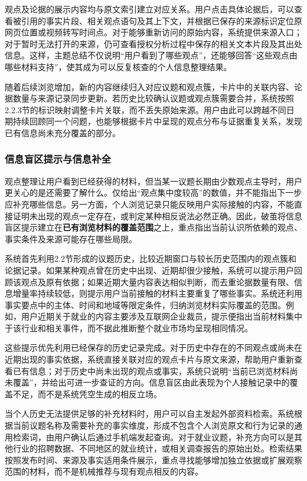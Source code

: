 观点及论据的展示内容均与原文索引建立对应关系。用户点击具体论据后，可以查看被引用的事实片段、相关观点语句及其上下文，并根据已保存的来源标识定位原网页位置或视频转写时间点。对于能够重新访问的原始内容，系统提供来源入口；对于暂时无法打开的来源，仍可查看授权分析过程中保存的相关文本片段及其出处信息。这样，主题总结不仅说明``用户看到了哪些观点''，还能够回答``这些观点由哪些材料支持''，使其成为可以反复核查的个人信息整理结果。

随着后续浏览增加，新的内容继续归入对应议题和观点簇，卡片中的关联内容、论据数量与来源记录同步更新。若历史比较确认议题或观点簇需要合并，系统按照2.2.3节的标识映射调整卡片关联，而不丢失原始来源。用户由此可以跨越不同日期持续回顾同一个问题，也能够根据卡片中呈现的观点分布与证据重复关系，发现已有信息尚未充分覆盖的部分。

\subsubsection{信息盲区提示与信息补全}\label{section:2.5.3}

观点整理让用户看到已经获得的材料，但当某一议题长期由少数观点主导时，用户更关心的是还需要了解什么。仅给出``观点集中度较高''的数值，并不能指出下一步应补充哪些信息。另一方面，个人浏览记录只能反映用户实际接触的内容，不能直接证明未出现的观点一定存在，或判定某种相反说法必然正确。因此，破茧将信息盲区提示建立在\textbf{已有浏览材料的覆盖范围}之上，重点指出当前认识所依赖的观点、事实条件及来源可能存在哪些局限。

系统首先利用2.2节形成的议题历史，比较近期窗口与较长历史范围内的观点簇和论据记录。如果某种观点曾在历史中出现、近期却很少接触，系统可以提示用户回顾该观点及原有依据；如果近期大量内容表达相似判断，而去重论据数量有限、信息增量率持续较低，则提示用户当前接触的材料主要重复了哪些事实。系统还利用事实要点中的主体、时间和地域等限定条件，归纳浏览材料实际覆盖的范围。例如，用户近期关于就业的内容主要涉及互联网企业裁员，提示便指出当前材料集中于该行业和相关事件，而不据此推断整个就业市场均呈现相同情况。

这些提示优先利用已经保存的历史记录完成。对于历史中存在的不同观点或尚未在近期出现的事实依据，系统直接关联对应的观点卡片与原文来源，帮助用户重新查看已有信息；对于历史中尚未出现的观点或事实，系统只说明``当前已浏览材料尚未覆盖''，并给出可进一步查证的方向。信息盲区由此表现为个人接触记录中的覆盖不足，而不是系统凭空生成的相反立场。

当个人历史无法提供足够的补充材料时，用户可以自主发起外部资料检索。系统根据当前议题名称及需要补充的事实维度，形成不包含个人浏览原文和行为记录的通用检索词，由用户确认后通过手机端发起查询。对于就业议题，补充方向可以是其他行业的招聘数据、不同地区的就业统计，或相关调查报告的原始出处。检索结果按照发布时间、来源及事实适用条件展示，重点寻找能够增加独立依据或扩展观察范围的材料，而不是机械推荐与现有观点相反的内容。

